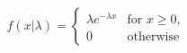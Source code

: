 $$
f(x|\lambda) =
\begin{cases}
\lambda e^{-\lambda x} & \text{for } x \geq 0, \\
0 & \text{otherwise}
\end{cases}
$$
